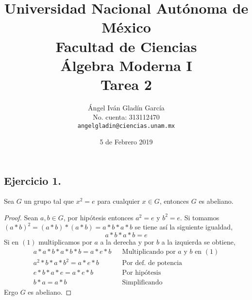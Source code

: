 \documentclass[11pt,letterpaper]{article}
\begin{document}
\title{
        Universidad Nacional Autónoma de México\\
        Facultad de Ciencias\\
        Álgebra Moderna I\\
    \vspace{.5cm}
    \large
        \textbf{Tarea 2}
}
\author{
    Ángel Iván Gladín García\\
    No. cuenta: 313112470\\
    \texttt{angelgladin@ciencias.unam.mx}
}
\date{5 de Febrero 2019}
\maketitle

\newtheorem{theorem}{Teorema}
\newtheorem{example}{Ejemplo}
\newtheorem{corollary}{Corolario}
\newtheorem{lemma}{Lemma}
\newtheorem{definition}{Definicion}
\newtheorem{prop}{Proposicion}

\subsection*{Ejercicio 1.}
Sea $G$ un grupo tal que $x^2 = e$ para cualquier $x \in G$, entonces $G$ es abeliano.
\begin{proof}
    Sean $a, b \in G$, por hipótesis entonces $a^2= e$ y $b^2 = e$. Si tomamos
    $(a \ast b)^2 = (a \ast b) \ast (a \ast b) = a \ast b \ast a \ast b$ se tiene así la
    siguiente igualdad,
    \[
        a \ast b \ast a \ast b = e  \tag{1}
    \]
    Si en $(1)$ multiplicamos por $a$ a la derecha y por $b$ a la izquierda se obtiene,
    \begin{align*}
        a \ast a \ast b \ast a \ast b \ast b = a \ast e \ast b && \text{Multiplicando por $a$ y $b$ en $(1)$}\\
        a^2 \ast b \ast a \ast b^2 = a \ast e \ast b && \text{Por def. de potencia}\\
        e \ast b \ast a \ast e = a \ast e \ast b && \text{Por hipótesis}\\
        b \ast a = a \ast b && \text{Simplificando}
    \end{align*}
    Ergo $G$ es abeliano.
\end{proof}
\end{document}
